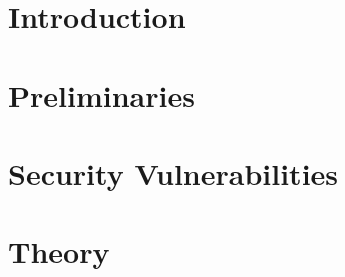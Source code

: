 %
%
%
%
% 



\pagestyle{empty} %



\cleardoublepage
{}
\pagestyle{fancy} %
\tableofcontents
\listoftodos

\cleardoublepage

\chapter{Introduction}\label{ch:introduction}

\chapter{Preliminaries}








\chapter{Security Vulnerabilities}


\chapter{Theory}















